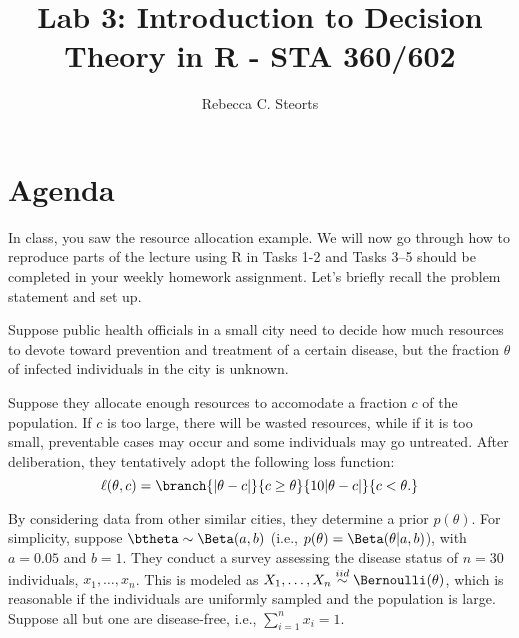\documentclass{article}
\begin{document}
\title{Lab 3: Introduction to Decision Theory in \textsf{R} - STA 360/602}
\author{Rebecca C. Steorts}
\date{}
\maketitle


\section{Agenda}

In class, you saw the resource allocation example. We will now go through how to reproduce parts of the lecture using R  in Tasks 1-2 and Tasks 3--5 should be completed in your weekly homework assignment. Let's briefly recall the problem statement and set up. 

Suppose public health officials in a small city need to decide how much resources to devote toward prevention and treatment of a certain disease, but the fraction $\theta$ of infected individuals in the city is unknown.

Suppose they allocate enough resources to accomodate a fraction $c$ of the population. If $c$ is too large, there will be wasted resources, while if it is too small, preventable cases may occur and some individuals may go untreated. After deliberation, they tentatively adopt the following loss function:
$$\ell(\theta,c) =\branch{|\theta-c|}{c\geq\theta}
                       {10|\theta-c|}{c<\theta.}$$
                       
By considering data from other similar cities, they determine a prior $p(\theta)$. For simplicity, suppose $\btheta\sim\Beta(a,b)$ (i.e., $p(\theta) =\Beta(\theta|a,b)$), with $a=0.05$ and $b=1$. They conduct a survey assessing the disease status of $n=30$ individuals, $x_1,\ldots,x_n$. This is modeled as $X_1,\ldots,X_n \stackrel{iid}{\sim} \Bernoulli(\theta)$, which is reasonable if the individuals are uniformly sampled and the population is large. Suppose all but one are disease-free, i.e.,
    $\sum_{i=1}^n x_i = 1$.                       
\end{document}
